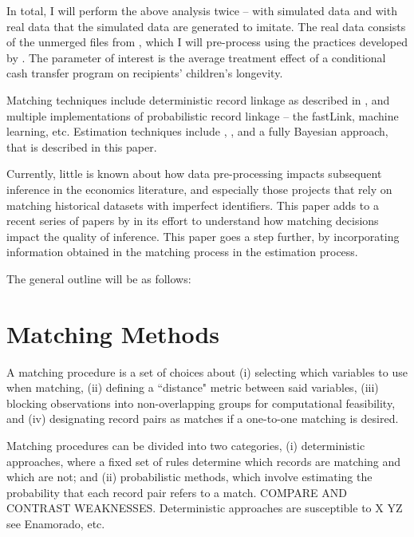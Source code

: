 \documentclass[12pt]{article}
\begin{document}
In total, I will perform the above analysis twice -- with simulated data and with real data that the simulated data are generated to imitate.  The real data consists of the unmerged files from \cite{aizer2016}, which I will pre-process using the practices developed by \cite{arp2018}.  The parameter of interest is the average treatment effect of a conditional cash transfer program on recipients' children's longevity.   

Matching techniques include deterministic record linkage as described in \cite{}, and multiple implementations of probabilistic record linkage -- the fastLink, machine learning, etc. Estimation techniques include \cite{ahl2019}, \cite{lahiri05}, and a fully Bayesian approach, that is described in this paper. 

Currently, little is known about how data pre-processing impacts subsequent inference in the economics literature, and especially those projects that rely on matching historical datasets with imperfect identifiers.  This paper adds to a recent series of papers by \cite{abe2019}  in its effort to understand how matching decisions impact the quality of inference.   This paper goes a step further, by incorporating information obtained in the matching process in the estimation process.  

The general outline will be as follows:


\section{Matching Methods}

A matching procedure is a set of choices about (i) selecting which variables to use when matching, (ii) defining a ``distance" metric between said variables, (iii) blocking observations into non-overlapping groups for computational feasibility, and (iv) designating record pairs as matches if a one-to-one matching is desired.    

Matching procedures can be divided into two categories, (i) deterministic approaches, where a fixed set of rules determine which records are matching and which are not; and (ii) probabilistic methods, which involve estimating the probability that each record pair refers to a match.  COMPARE AND CONTRAST WEAKNESSES.  Deterministic approaches are susceptible to X YZ  see Enamorado, etc. 
\end{document}
